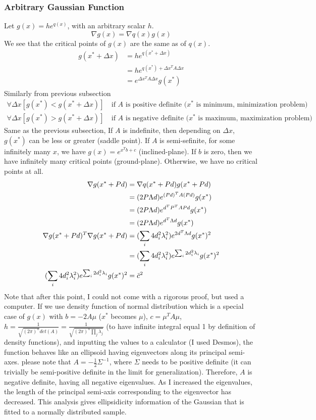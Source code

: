 \documentclass{article}
\numberwithin{equation}{subsection}
\begin{document}
\subsubsection{Arbitrary Gaussian Function}
Let $g(x) = he^{q(x)}$, with an arbitrary scalar $h$. 
\begin{equation}
    \nabla g(x) = \nabla q(x) g(x)
\end{equation}
We see that the critical points of $g(x)$ are the same as of $q(x)$. 
\begin{align}
    g(x^*+\Delta x) &= he^{q(x^*+\Delta x)}\\
     &= he^{q(x^*) + \Delta x^TA\Delta x}\\
     &= e^{\Delta x^TA\Delta x}g(x^*)
\end{align}
Similarly from previous subsection
\begin{align}
    \forall \Delta x [g(x^*) < g(x^*+\Delta x)] & \ \text{if $A$ is positive definite ($x^*$ is minimum, minimization problem)}\\
    \forall \Delta x [g(x^*) > g(x^*+\Delta x)] & \ \text{if $A$ is negative definite ($x^*$ is maximum, maximization problem)}
\end{align}
Same as the previous subsection, If $A$ is indefinite, then depending on $\Delta x$, $g(x^*)$ can be less or greater (saddle point). If $A$ is semi-sefinite, for some infinitely many $x$, we have $g(x) = e^{x^Tb+c}$ (inclined-plane). If $b$ is zero, then we have infinitely many critical points (ground-plane). Otherwise, we have no critical points at all.
\begin{align}
    \nabla g(x^*+Pd) &= \nabla q(x^*+Pd) g(x^*+Pd)\\
    &= (2P\Lambda d) e^{(Pd)^TA(Pd)}g(x^*)\\
    &= (2P\Lambda d) e^{d^TP^TAPd}g(x^*)\\
    &= (2P\Lambda d) e^{d^T\Lambda d}g(x^*)\\
    \nabla g(x^*+Pd)^T \nabla g(x^*+Pd) &= (\sum_i 4d_i^2\lambda_i^2)e^{2d^T\Lambda d}g(x^*)^2\\
    &= (\sum_i 4d_i^2\lambda_i^2)e^{\sum_i 2d_i^2\lambda_i}g(x^*)^2\\
    (\sum_i 4d_i^2\lambda_i^2)e^{\sum_i 2d_i^2\lambda_i}g(x^*)^2 &= \Tilde{c}^2
\end{align}
Note that after this point, I could not come with a rigorous proof, but used a computer.
If we use density function of normal distribution which is a special case of $g(x)$ with $b=-2A\mu$ ($x^*$ becomes $\mu$), $c=\mu^TA\mu$, $h = \frac{1}{\sqrt{(2\pi)^n}det(A)} = \frac{1}{\sqrt{(2\pi)^n\prod_j \lambda_j}}$ (to have infinite integral equal 1 by definition of density functions), and inputting the values to a calculator (I used Desmos), the function behaves like an ellipsoid having eigenvectors along its principal semi-axes. please note that $A=-\frac{1}{2}\Sigma^{-1}$, where $\Sigma$ needs to be positive definite (it can trivially be semi-positive definite in the limit for generalization). Therefore, $A$ is negative definite, having all negative eigenvalues. As I increased the eigenvalues, the length of the principal semi-axis corresponding to the eigenvector has decreased. 
This analysis gives ellipsidicity information of the Gaussian that is fitted to a normally distributed sample. 
\end{document}
